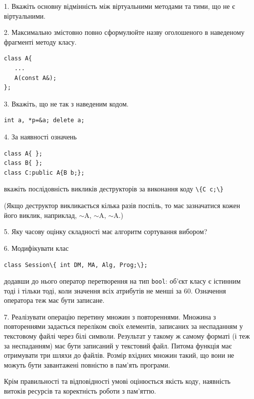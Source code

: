 \documentclass[12pt, ukrainian]{article}
\def\code#1{\Verb!#1!}
\begin{document}
{%
1. Вкажіть основну відмінність між віртуальними методами та тими, що не є віртуальними.%
\par
\vspace{2mm}
2. Максимально змістовно повно сформулюйте назву оголошеного в наведеному фрагменті методу класу.
\vspace{-3mm}
\begin{verbatim}class A{
   ...
   A(const A&);
};\end{verbatim}
\vspace{-3mm}
\par
\vspace{2mm}
3. Вкажіть, що не так з наведеним кодом.
\vspace{-3mm}
\begin{verbatim}int a, *p=&a; delete a;\end{verbatim}
\vspace{-3mm}
\par
\vspace{2mm}
4. За наявності означень
\vspace{-3mm}
\begin{verbatim}
class A{ };
class B{ };
class C:public A{B b;};\end{verbatim}
\vspace{-3mm}
вкажіть послідовність викликів деструкторів за виконання коду \code{\{C c;\}} 

(Якщо деструктор викликається кілька разів поспіль, то має зазначатися кожен його виклик, наприклад, $\sim$A, $\sim$A, $\sim$A.)

\vspace{2mm}
5. Яку часову оцінку складності має алгоритм сортування вибором?
\par
\vspace{2mm}
6. Модифікувати клас 

\qquad\code{class Session\{ int DM, MA, Alg, Prog;\};} 


додавши до нього оператор перетворення на тип \code{bool}: об'єкт класу є істинним тоді і тільки тоді, коли значення всіх атрибутів не менші за 60. Означення оператора теж має бути записане.%
\par
\vspace{2mm}
7. 
Реалізувати операцію перетину множин з повтореннями. Множина з повтореннями задається переліком своїх елементів, записаних за неспаданням у текстовому файлі через білі символи. Результат у такому ж самому форматі (і теж за неспаданням) має бути записаний у текстовий файл. Питома функція має отримувати три шляхи до файлів. Розмір вхідних множин такий, що вони не можуть бути завантажені повністю в пам’ять програми.

Крім правильності та відповідності умові оцінюється якість коду, наявність витоків ресурсів та коректність роботи з пам'яттю. 

}
\end{document}
